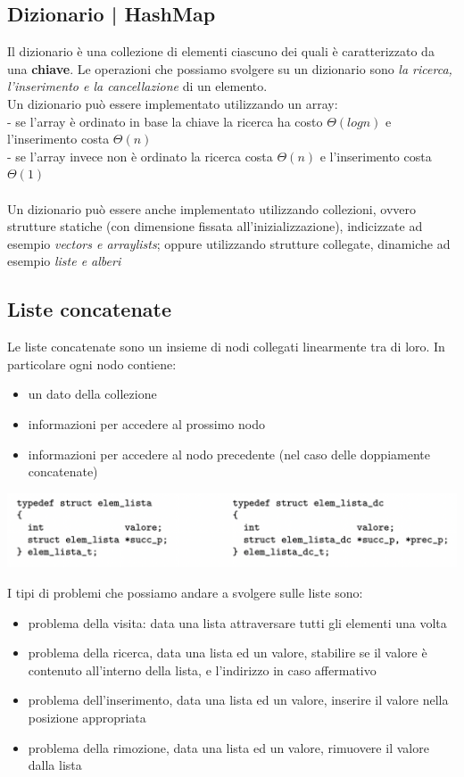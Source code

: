 \documentclass[11pt, oneside]{article}   	%
\begin{document}
\subsection{Dizionario | HashMap}
Il dizionario è una collezione di elementi ciascuno dei quali è caratterizzato da una \textbf{chiave}. Le operazioni che possiamo svolgere su un dizionario sono \emph{la ricerca, l'inserimento e la cancellazione} di un elemento. \\
Un dizionario può essere implementato utilizzando un array:\\
- se l'array è ordinato in base la chiave la ricerca ha costo $\Theta(logn)$ e l'inserimento costa $\Theta(n)$\\
- se l'array invece non è ordinato la ricerca costa $\Theta(n)$ e l'inserimento costa $\Theta(1)$\\\\
Un dizionario può essere anche implementato utilizzando collezioni, ovvero strutture statiche (con dimensione fissata all'inizializzazione), indicizzate ad esempio \emph{vectors e arraylists}; oppure utilizzando strutture collegate, dinamiche ad esempio \emph{liste e alberi}

\subsection{Liste concatenate}
Le liste concatenate sono un insieme di nodi collegati linearmente tra di loro. In particolare ogni nodo contiene:
\begin{itemize}
\item un dato della collezione
\item informazioni per accedere al prossimo nodo
\item informazioni per accedere al nodo precedente (nel caso delle doppiamente concatenate)
\end{itemize}
\begin{center}
\includegraphics[scale=0.7]{conca}
\end{center}
I tipi di problemi che possiamo andare a svolgere sulle liste sono:
\begin{itemize}
\item problema della visita: data una lista attraversare tutti gli elementi una volta
\item problema della ricerca, data una lista ed un valore, stabilire se il valore è contenuto all'interno della lista, e l'indirizzo in caso affermativo
\item problema dell'inserimento, data una lista ed un valore, inserire il valore nella posizione appropriata
\item problema della rimozione, data una lista ed un valore, rimuovere il valore dalla lista
\end{itemize}
\end{document}
